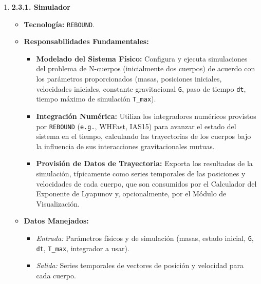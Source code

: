 \begin{enumerate} %
    \item \textbf{2.3.1. Simulador}
    \begin{itemize}
        \item \textbf{Tecnología:} \texttt{REBOUND}.
        \item \textbf{Responsabilidades Fundamentales:}
        \begin{itemize}
            \item \textbf{Modelado del Sistema Físico:} Configura y ejecuta simulaciones del problema de N-cuerpos (inicialmente dos cuerpos) de acuerdo con los parámetros proporcionados (masas, posiciones iniciales, velocidades iniciales, constante gravitacional \texttt{G}, paso de tiempo \texttt{dt}, tiempo máximo de simulación \texttt{T\_max}).
            \item \textbf{Integración Numérica:} Utiliza los integradores numéricos provistos por \texttt{REBOUND} (\texttt{e.g.}, WHFast, IAS15) para avanzar el estado del sistema en el tiempo, calculando las trayectorias de los cuerpos bajo la influencia de sus interacciones gravitacionales mutuas.
            \item \textbf{Provisión de Datos de Trayectoria:} Exporta los resultados de la simulación, típicamente como series temporales de las posiciones y velocidades de cada cuerpo, que son consumidos por el Calculador del Exponente de Lyapunov y, opcionalmente, por el Módulo de Visualización.
        \end{itemize}
        \item \textbf{Datos Manejados:}
        \begin{itemize}
            \item \textit{Entrada:} Parámetros físicos y de simulación (masas, estado inicial, \texttt{G}, \texttt{dt}, \texttt{T\_max}, integrador a usar).
            \item \textit{Salida:} Series temporales de vectores de posición y velocidad para cada cuerpo.
        \end{itemize}
    \end{itemize}


\end{enumerate}
